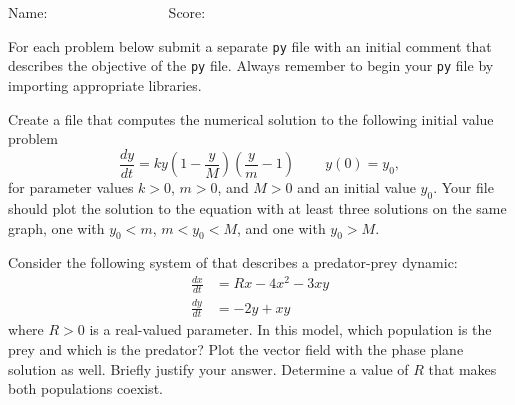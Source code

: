 \documentclass[10pt]{article}
\newcommand{\de}[2]{\frac{d #1}{d #2}}
\begin{document}
\vspace{2cm}
\flushright Name: $\qquad \qquad \qquad \qquad $
\flushright Score: $\qquad \qquad \qquad \qquad $

\pagebreak







\flushleft
For each problem below submit a separate \texttt{py} file with an initial comment that describes the objective of the \texttt{py} file.  Always remember to begin your \texttt{py} file by importing appropriate libraries.  

\begin{enumerate}[{$\qquad 1.]$}]

\item Create a file that computes the numerical solution to the following initial value problem
\[ \de{y}{t} = ky\left(1-\frac{y}{M}\right)\left(\frac{y}{m} - 1\right)\, \qquad y(0) = y_0,\]
for parameter values $k>0$, $m>0$, and $M>0$ and an initial value $y_0$.  Your file should plot the solution to the equation with at least three solutions on the same graph, one with $y_0<m$, $m<y_0<M$, and one with $y_0>M$. 






 \item Consider the following system of that describes a predator-prey dynamic: 
\begin{align*}
\de{x}{t} & = Rx - 4x^2 - 3xy\\ 
\de{y}{t} & = -2y + xy \end{align*}
where $R>0$ is a real-valued parameter.  In this model, which population is the prey and which is the predator?  Plot the vector field with the phase plane solution as well. Briefly justify your answer.  Determine a value of $R$ that makes both populations coexist. 



\end{enumerate}
\end{document}

